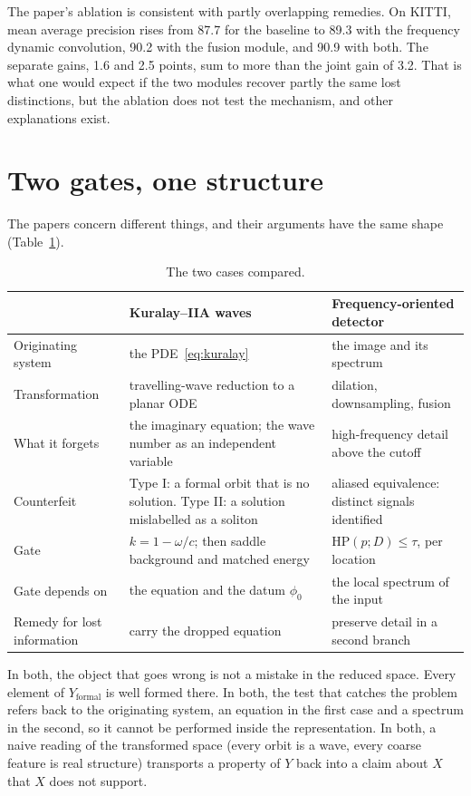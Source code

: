 \documentclass[11pt]{article}
\theoremstyle{definition}
\theoremstyle{remark}
\newcommand{\Yf}{Y_{\mathrm{formal}}}
\newcommand{\HP}{\mathrm{HP}}
\begin{document}
The paper's ablation is consistent with partly overlapping remedies. On KITTI, mean average precision rises from 87.7 for the baseline to 89.3 with the frequency dynamic convolution, 90.2 with the fusion module, and 90.9 with both. The separate gains, 1.6 and 2.5 points, sum to more than the joint gain of 3.2. That is what one would expect if the two modules recover partly the same lost distinctions, but the ablation does not test the mechanism, and other explanations exist.

\section{Two gates, one structure}

The papers concern different things, and their arguments have the same shape (Table~\ref{tab:compare}).

\begin{table}[t]
\centering
\small
\begin{tabularx}{\textwidth}{@{}p{2.6cm}XX@{}}
\toprule
 & Kuralay--IIA waves & Frequency-oriented detector \\
\midrule
Originating system & the PDE~\eqref{eq:kuralay} & the image and its spectrum \\
Transformation & travelling-wave reduction to a planar ODE & dilation, downsampling, fusion \\
What it forgets & the imaginary equation; the wave number as an independent variable & high-frequency detail above the cutoff \\
Counterfeit & Type I: a formal orbit that is no solution. Type II: a solution mislabelled as a soliton & aliased equivalence: distinct signals identified \\
Gate & $k=1-\omega/c$; then saddle background and matched energy & $\HP(p;D)\le\tau$, per location \\
Gate depends on & the equation and the datum $\phi_0$ & the local spectrum of the input \\
Remedy for lost information & carry the dropped equation & preserve detail in a second branch \\
\bottomrule
\end{tabularx}
\caption{The two cases compared.}
\label{tab:compare}
\end{table}

In both, the object that goes wrong is not a mistake in the reduced space. Every element of $\Yf$ is well formed there. In both, the test that catches the problem refers back to the originating system, an equation in the first case and a spectrum in the second, so it cannot be performed inside the representation. In both, a naive reading of the transformed space (every orbit is a wave, every coarse feature is real structure) transports a property of $Y$ back into a claim about $X$ that $X$ does not support.
\end{document}
